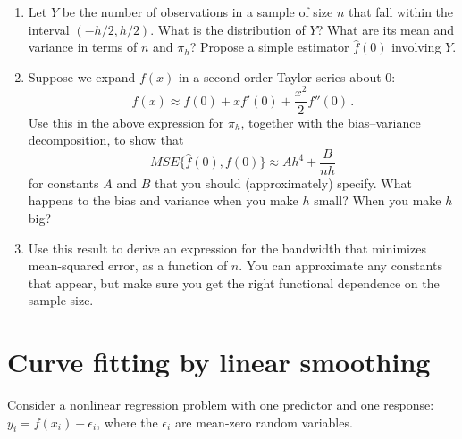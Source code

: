 \documentclass{homework}
\begin{document}
\begin{enumerate}[label=(\Alph*)]
\item Let $Y$ be the number of observations in a sample of size $n$ that fall within the interval $(-h/2, h/2)$.  What is the distribution of $Y$?  What are its mean and variance in terms of $n$ and $\pi_h$?  Propose a simple estimator $\hat{f}(0)$ involving $Y$.
\item Suppose we expand $f(x)$ in a second-order Taylor series about $0$:
$$
f(x) \approx f(0) + x f'(0) + \frac{x^2}{2} f''(0) \, .
$$
Use this in the above expression for $\pi_h$, together with the bias--variance decomposition, to show that
$$
MSE\{ \hat{f}(0), f(0) \} \approx A h^4 + \frac{B}{nh}
$$
for constants $A$ and $B$ that you should (approximately) specify.  What happens to the bias and variance when you make $h$ small?  When you make $h$ big?

\item Use this result to derive an expression for the bandwidth that minimizes mean-squared error, as a function of $n$.  You can approximate any constants that appear, but make sure you get the right functional dependence on the sample size.

\end{enumerate}


%


\section{Curve fitting by linear smoothing}

Consider a nonlinear regression problem with one predictor and one response: $y_i = f(x_i) + \epsilon_i$, where the $\epsilon_i$ are mean-zero random variables.
\end{document}
